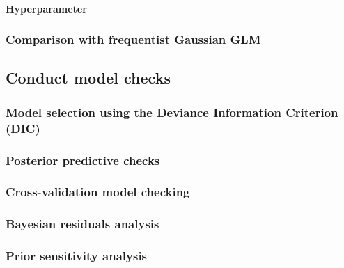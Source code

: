 \documentclass[
]{book}
\begin{document}
\hypertarget{hyperparameter-1}{%
\paragraph{Hyperparameter}\label{hyperparameter-1}}

\hypertarget{comparison-with-frequentist-gaussian-glm}{%
\subsubsection{Comparison with frequentist Gaussian
GLM}\label{comparison-with-frequentist-gaussian-glm}}

\hypertarget{conduct-model-checks}{%
\subsection{Conduct model checks}\label{conduct-model-checks}}

\hypertarget{model-selection-using-the-deviance-information-criterion-dic}{%
\subsubsection{Model selection using the Deviance Information Criterion
(DIC)}\label{model-selection-using-the-deviance-information-criterion-dic}}

\hypertarget{posterior-predictive-checks}{%
\subsubsection{Posterior predictive
checks}\label{posterior-predictive-checks}}

\hypertarget{cross-validation-model-checking}{%
\subsubsection{Cross-validation model
checking}\label{cross-validation-model-checking}}

\hypertarget{bayesian-residuals-analysis}{%
\subsubsection{Bayesian residuals
analysis}\label{bayesian-residuals-analysis}}

\hypertarget{prior-sensitivity-analysis}{%
\subsubsection{Prior sensitivity
analysis}\label{prior-sensitivity-analysis}}
\end{document}
